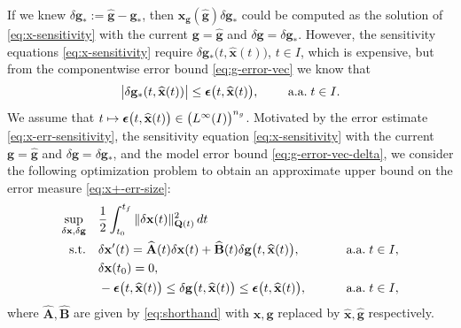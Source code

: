 \documentclass[onefignum,onetabnum]{siamart220329}
\numberwithin{equation}{section}
\newcommand{\aall}{\mbox{ a.a.} \;}
\newcommand{\bg}{\ensuremath{\mathbf{g}}} %
\newcommand{\bx}{\ensuremath{\mathbf{x}}} %
\newcommand {\bepsilon} {\mbox{\boldmath $\epsilon$}}
\newcommand{\BA}{\ensuremath{\mathbf{A}} } %
\newcommand{\BB}{\ensuremath{\mathbf{B}} } %
\newcommand{\BQ}{\ensuremath{\mathbf{Q}} } %
\begin{document}
If we knew  $\delta \bg_* := \widehat{\bg} - \bg_*$, then $ \bx_\bg(\widehat{\bg})  \delta \bg_*$ could be computed as
the solution of \eqref{eq:x-sensitivity} with the current  $\bg = \widehat{\bg}$ and  $\delta \bg = \delta \bg_*$.
However, the sensitivity equations \eqref{eq:x-sensitivity} require $\delta \bg_*\big(t, \widehat{\bx}(t)\big)$, $t \in I$, which is expensive,
but from the componentwise error bound \eqref{eq:g-error-vec} we
know that 
\begin{equation}    \label{eq:g-error-vec-delta}
	\big| \delta \bg_*( t, \widehat{\bx}(t) ) \big| \leq  \bepsilon\big(t, \widehat{\bx}(t)\big), \qquad \aall t \in I.
\end{equation}
We assume that $t \mapsto \bepsilon\big( t, \widehat{\bx}(t) \big) \in \big(L^\infty(I) \big)^{n_g}$.
Motivated by the error estimate \eqref{eq:x-err-sensitivity}, the 
sensitivity equation \eqref{eq:x-sensitivity} with the current  $\bg = \widehat{\bg}$ and  $\delta \bg = \delta \bg_*$,
and the model error bound \eqref{eq:g-error-vec-delta}, we consider the following optimization problem to obtain an approximate upper bound on the error measure \eqref{eq:x+-err-size}:
\begin{equation} \label{eq:Refinement:ODE:LQOCP0}
\begin{aligned}
	\sup_{\delta \bx, \delta \bg} \quad &\frac{1}{2} \int_{t_0}^{t_f} \| \delta \bx(t) \|_{\BQ(t)}^2 \, dt \\
	\mbox{s.t.} \quad & \delta \bx'(t) = \widehat{\BA}(t)  \delta \bx(t) +  \widehat{\BB}(t) \delta \bg\big( t, \widehat{\bx}(t) \big), & \qquad \aall t \in I, \\
	& \delta \bx(t_0) = 0, \\
	& - \bepsilon\big( t, \widehat{\bx}(t) \big) \leq \delta \bg\big( t, \widehat{\bx}(t) \big) \leq \bepsilon\big( t, \widehat{\bx}(t) \big), & \qquad \aall t \in I,
\end{aligned}
\end{equation}
where $\widehat{\BA}, \widehat{\BB}$ are given by \eqref{eq:shorthand} with $\bx, \bg$ replaced by $\widehat{\bx}, \widehat{\bg}$ respectively.
\end{document}
